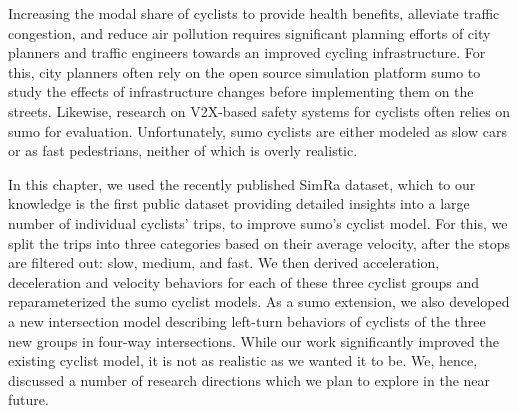 Increasing the modal share of cyclists to provide health benefits, alleviate traffic congestion, and reduce air pollution requires significant planning efforts of city planners and traffic engineers towards an improved cycling infrastructure.
For this, city planners often rely on the open source simulation platform \ac{sumo} to study the effects of infrastructure changes before implementing them on the streets.
Likewise, research on V2X-based safety systems for cyclists often relies on \ac{sumo} for evaluation.
Unfortunately, \ac{sumo} cyclists are either modeled as slow cars or as fast pedestrians, neither of which is overly realistic.

In this chapter, we used the recently published SimRa dataset, which to our knowledge is the first public dataset providing detailed insights into a large number of individual cyclists' trips, to improve \ac{sumo}'s cyclist model.
For this, we split the trips into three categories based on their average velocity, after the stops are filtered out: slow, medium, and fast.
We then derived acceleration, deceleration and velocity behaviors for each of these three cyclist groups and reparameterized the \ac{sumo} cyclist models.
As a \ac{sumo} extension, we also developed a new intersection model describing left-turn behaviors of cyclists of the three new groups in four-way intersections.
While our work significantly improved the existing cyclist model, it is not as realistic as we wanted it to be.
We, hence, discussed a number of research directions which we plan to explore in the near future.
